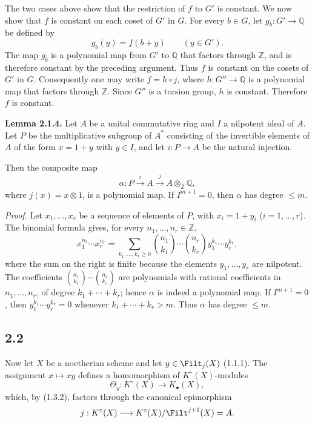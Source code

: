 The two cases above show that the restriction of $f$ to $G'$ is constant.
We now show that $f$ is constant on each coset of $G'$ in $G$. For every
$b\in G$, let $g_b:G'\to\mathbb Q$ be defined by
\[
g_b(y)=f(b+y)\qquad(y\in G').
\]
The map $g_b$ is a polynomial map from $G'$ to $\mathbb Q$ that factors
through $\mathbb Z$, and is therefore constant by the preceding argument.
Thus $f$ is constant on the cosets of $G'$ in $G$. Consequently one may
write $f=h\circ j$, where $h:G''\to\mathbb Q$ is a polynomial map that
factors through $\mathbb Z$. Since $G''$ is a torsion group, $h$ is constant.
Therefore $f$ is constant.

\textbf{Lemma 2.1.4.}
Let $A$ be a unital commutative ring and $I$ a nilpotent ideal of $A$. Let
$P$ be the multiplicative subgroup of $A^*$ consisting of the invertible elements
of $A$ of the form $x=1+y$ with $y\in I$, and let $i:P\to A$ be the natural
injection.

Then the composite map
\[
\alpha:P\xrightarrow{i}A\xrightarrow{j}A\otimes_{\mathbb Z}\mathbb Q,
\]
where $j(x)=x\otimes1$, is a polynomial map. If $I^{m+1}=0$, then $\alpha$
has degree $\leq m$.

\emph{Proof.}
Let $x_1,\ldots,x_r$ be a sequence of elements of $P$, with
$x_i=1+y_i$ ($i=1,\ldots,r$). The binomial formula gives, for every
$n_1,\ldots,n_r\in\mathbb Z$,
\begin{equation}\tag{2.1.5}
x_1^{n_1}\cdots x_r^{n_r}=
\sum_{k_1,\ldots,k_r\geq0}
\binom{n_1}{k_1}\cdots\binom{n_r}{k_r}
y_1^{k_1}\cdots y_r^{k_r},
\end{equation}
where the sum on the right is finite because the elements
$y_1,\ldots,y_r$ are nilpotent. The coefficients
$\binom{n_1}{k_1}\cdots\binom{n_r}{k_r}$ are polynomials with rational
coefficients in $n_1,\ldots,n_r$, of degree $k_1+\cdots+k_r$; hence
$\alpha$ is indeed a polynomial map. If $I^{m+1}=0$, then
$y_1^{k_1}\cdots y_r^{k_r}=0$ whenever $k_1+\cdots+k_r>m$. Thus $\alpha$
has degree $\leq m$.

\subsection*{2.2}
Now let $X$ be a noetherian scheme and let $y\in\Filt_j(X)$ (1.1.1). The
assignment $x\mapsto xy$ defines a homomorphism of $K^\circ(X)$-modules
\[
\Theta_y:K^\circ(X)\longrightarrow K_\bullet(X),
\]
which, by (1.3.2), factors through the canonical epimorphism
\[
j:K^\circ(X)\longrightarrow
K^\circ(X)/\Filt^{j+1}(X)=A.
\]

